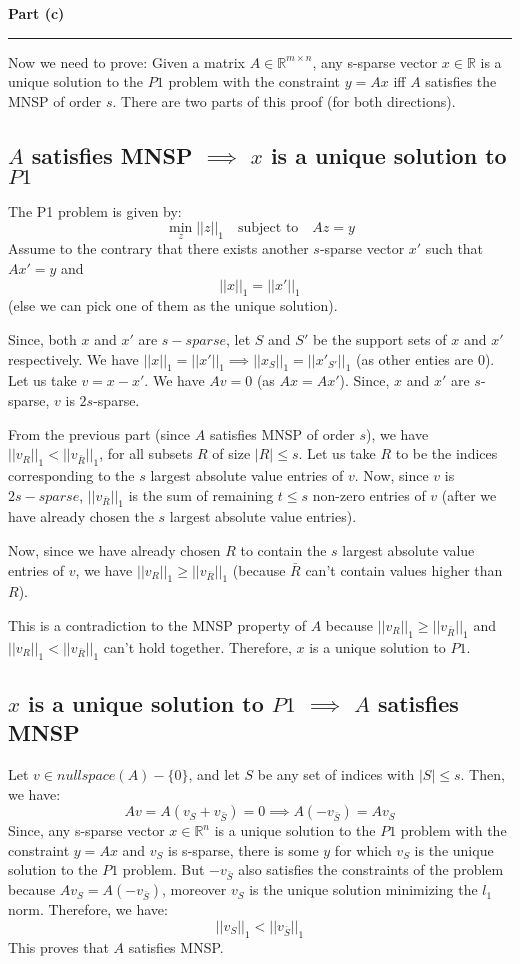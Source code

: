 \documentclass[a4paper,12pt]{article}
\newenvironment{solution}[2][]{%
    \begin{mdframed}[linecolor=blue!70!black, linewidth=2pt, roundcorner=10pt, backgroundcolor=yellow!10!white, skipabove=12pt, skipbelow=12pt]%
        \textbf{\large #2}
        \par\noindent\rule{\textwidth}{0.4pt}
}{
    \end{mdframed}
}
\begin{document}
\begin{solution}{Part (c)}
  Now we need to prove:
  Given a matrix $A \in \mathbb{R}^{m\times n}$, any s-sparse vector $x \in \mathbb{R}$ is a unique solution to the $P1$ problem with the constraint $y = Ax$ iff $A$ satisfies the MNSP of order $s$. There are two parts of this proof (for both directions).

  \subsection*{$A$ satisfies MNSP $\implies$ $x$ is a unique solution to $P1$}
  The P1 problem is given by:
  \[
    \min_{z}||z||_1 \quad \text{subject to} \quad Az = y
  \]
  Assume to the contrary that there exists another $s$-sparse vector $x'$ such that $Ax' = y$ and $$||x||_1 = ||x'||_1$$ (else we can pick one of them as the unique solution). 

  Since, both $x$ and $x'$ are $s-sparse$, let $S$ and $S'$ be the support sets of $x$ and $x'$ respectively. We have $||x||_1 = ||x'||_1 \implies ||x_S||_1 = ||x'_{S'}||_1$ (as other enties are 0). Let us take $v = x - x'$. We have $Av = 0$ (as $Ax = Ax'$). Since, $x$ and $x'$ are $s$-sparse, $v$ is $2s$-sparse. 

  From the previous part (since $A$ satisfies MNSP of order $s$), we have $||v_R||_1 < ||v_{\bar{R}}||_1$, for all subsets $R$ of size $|R| \leq s$. Let us take $R$ to be the indices corresponding to the $s$ largest absolute value entries of $v$. Now, since $v$ is $2s-sparse$, $||v_{\bar{R}}||_1$ is the sum of remaining $t \leq s$ non-zero entries of $v$ (after we have already chosen the $s$ largest absolute value entries).
  
  Now, since we have already chosen $R$ to contain the $s$ largest absolute value entries of $v$, we have $||v_R||_1 \geq ||v_{\bar{R}}||_1$ (because $\bar{R}$ can't contain values higher than $R$). 
  
  This is a contradiction to the MNSP property of $A$ because $||v_R||_1 \geq ||v_{\bar{R}}||_1$ and $||v_R||_1 < ||v_{\bar{R}}||_1$ can't hold together. Therefore, $x$ is a unique solution to $P1$.

  \subsection*{$x$ is a unique solution to $P1$ $\implies$ $A$ satisfies MNSP}
  Let $v \in nullspace(A) - \{0\}$, and let $S$ be any set of indices with $|S| \leq s$. Then, we have:
  \[
  Av = A(v_S + v_{\bar{S}}) = 0 \implies A(-v_{\bar{S}}) = Av_S
  \]
  Since, any s-sparse vector $x \in \mathbb{R}^n$ is a unique solution to the $P1$ problem with the constraint $y = Ax$ and $v_S$ is s-sparse, there is some $y$ for which $v_S$ is the unique solution to the $P1$ problem. But $-v_{\bar{S}}$ also satisfies the constraints of the problem because $Av_S = A(-v_{\bar{S}})$, moreover $v_S$ is the unique solution minimizing the $l_1$ norm. Therefore, we have:
  \[
  ||v_S||_1 < ||v_{\bar{S}}||_1
  \]
  This proves that $A$ satisfies MNSP.  
\end{solution}
\end{document}
